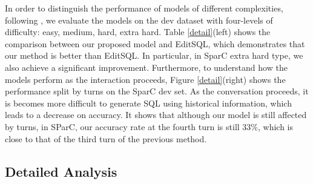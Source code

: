 \documentclass[letterpaper]{article} \usepackage{aaai21}  \usepackage{times}  \usepackage{helvet} \usepackage{courier}  \usepackage[hyphens]{url}  \usepackage{graphicx} \urlstyle{rm} \def\UrlFont{\rm}  \usepackage{natbib}  \usepackage{caption} \frenchspacing  \setlength{\pdfpagewidth}{8.5in}  \setlength{\pdfpageheight}{11in}
\begin{document}
In order to distinguish the performance of models of different complexities, following \cite{DBLP:conf/emnlp/YuZYYWLMLYRZR18}, we evaluate the models on the dev dataset with four-levels of difficulty: easy, medium, hard, extra hard. 
Table \ref{detail}(left) shows the comparison between our proposed model and EditSQL, which demonstrates that our method is better than EditSQL.
In particular, in SparC extra hard type, we also achieve a significant improvement. 
Furthermore, to understand how the models perform as the interaction proceeds, Figure \ref{detail}(right) shows the performance split by turns on the SparC dev set.
As the conversation proceeds, it is becomes more difficult to generate SQL using historical information, which leads to a decrease on accuracy.
It shows that although our model is still affected by turns, in SParC, our accuracy rate at the fourth turn is still 33\%, which is close to that of the third turn of the previous method.


\begin{table}[t]
    \small
	\centering
	\caption{Ablation study of proposed method over Ques. (question match) and Int. (interaction match) in dev set.}
	\label{ablation}
\end{table}



\subsection{Detailed Analysis}
\label{sec:analysis}
\end{document}
